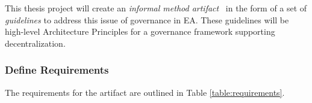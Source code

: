 This thesis project will create an \textit{informal method artifact}~\cite[Ch. 2.4]{johannessonPerjons2012} in the form of a set of \textit{guidelines} to address this issue of governance in EA. These guidelines will be high-level Architecture Principles for a governance framework supporting decentralization.



%
%
%


\subsubsection*{Define Requirements}

The requirements for the artifact are outlined in Table \ref{table:requirements}.

